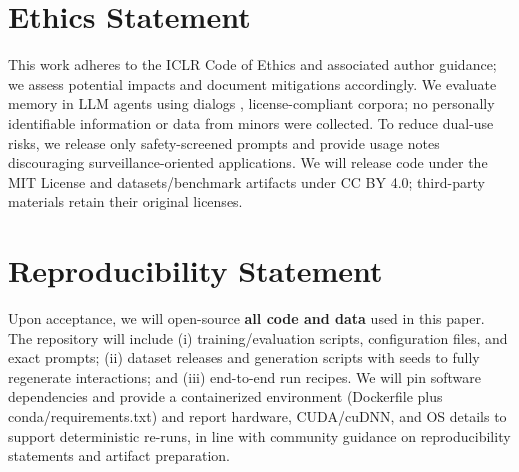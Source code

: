 \section*{Ethics Statement}


This work adheres to the ICLR Code of Ethics and associated author guidance; we assess potential impacts and document mitigations accordingly. We evaluate memory in LLM agents using dialogs , license-compliant corpora; no personally identifiable information or data from minors were collected. To reduce dual-use risks, we release only safety-screened prompts and provide usage notes discouraging surveillance-oriented applications. We will release code under the MIT License and datasets/benchmark artifacts under CC BY 4.0; third-party materials retain their original licenses. 







\section*{Reproducibility Statement}

Upon acceptance, we will open-source \textbf{all code and data} used in this paper. The repository will include (i) training/evaluation scripts, configuration files, and exact prompts; (ii) dataset releases and generation scripts with seeds to fully regenerate  interactions; and (iii) end-to-end run recipes. We will pin software dependencies and provide a containerized environment (Dockerfile plus conda/requirements.txt) and report hardware, CUDA/cuDNN, and OS details to support deterministic re-runs, in line with community guidance on reproducibility statements and artifact preparation. 